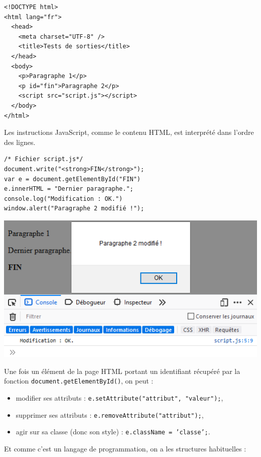 \begin{multicols}{2}

\begin{verbatim}
<!DOCTYPE html>
<html lang="fr">
  <head>
    <meta charset="UTF-8" />
    <title>Tests de sorties</title>
  </head>
  <body>
    <p>Paragraphe 1</p>
    <p id="fin">Paragraphe 2</p>
    <script src="script.js"></script>
  </body>
</html>
\end{verbatim}

Les instructions JavaScript, comme le contenu HTML, est interprété dans l'ordre des lignes.

\begin{verbatim}
/* Fichier script.js*/
document.write("<strong>FIN</strong>");
var e = document.getElementById("FIN")
e.innerHTML = "Dernier paragraphe.";
console.log("Modification : OK.")
window.alert("Paragraphe 2 modifié !");
\end{verbatim}

\noindent\includegraphics[width=\linewidth]{images/jslog.png}

\end{multicols}

Une fois un élément de la page HTML portant un identifiant récupéré par la fonction \texttt{document.getElementById()}, on peut :

\begin{itemize}
	\item modifier ses attributs : \texttt{e.setAttribute("attribut", "valeur");},
	\item supprimer ses attributs : \texttt{e.removeAttribute("attribut");},
	\item agir sur sa classe (donc son style) : \texttt{e.className = 'classe';}.
\end{itemize}

Et comme c'est un langage de programmation, on a les structures habituelles :

